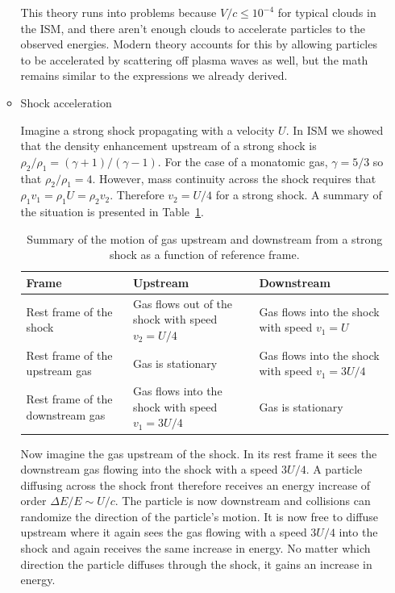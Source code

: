 \begin{enumerate}
\begin{itemize}
            This theory runs into problems because $V/c\le10^{-4}$ for typical clouds in the
            ISM, and there aren't enough clouds to accelerate particles to the observed energies.
            Modern theory accounts for this by allowing particles to be accelerated by scattering
            off plasma waves as well, but the math remains similar to the expressions we
            already derived.

      \item Shock acceleration

            Imagine a strong shock propagating with a velocity $U$.  In ISM we showed that the
            density enhancement upstream of a strong shock is
            $\rho_2/\rho_1 = (\gamma+1)/(\gamma-1)$.  For the case of a monatomic gas,
            $\gamma=5/3$ so that $\rho_2/\rho_1 = 4$.  However, mass continuity across the shock
            requires that $\rho_1v_1 = \rho_1U = \rho_2v_2$.  Therefore $v_2 = U/4$ for a
            strong shock.  A summary of the situation is presented in Table~\ref{tab:strong_shock_speeds}.

            \begin{table}[ht]
            \centering
            \begin{tabular}{p{1.5in}p{1.5in}p{1.5in}}
            \toprule
            Frame & Upstream & Downstream \\
            \midrule
            Rest frame of the shock &
                Gas flows out of the shock with speed $v_2 = U/4$ &
                Gas flows into the shock with speed $v_1 = U$ \\
            Rest frame of the upstream gas &
                Gas is stationary &
                Gas flows into the shock with speed $v_1 = 3U/4$ \\
            Rest frame of the downstream gas &
                Gas flows into the shock with speed $v_1 = 3U/4$ &
                Gas is stationary \\
            \bottomrule
            \end{tabular}
            \caption{Summary of the motion of gas upstream and downstream from a strong shock
                     as a function of reference frame.}
            \label{tab:strong_shock_speeds}
            \end{table}

            Now imagine the gas upstream of the shock.  In its rest frame it sees the downstream
            gas flowing into the shock with a speed $3U/4$.  A particle diffusing across the shock
            front therefore receives an energy increase of order $\Delta E/E \sim U/c$.
            The particle is now downstream and collisions can randomize the direction of the
            particle's motion.  It is now free to diffuse upstream where it again sees the
            gas flowing with a speed $3U/4$ into the shock and again receives the same increase
            in energy.  No matter which direction the particle diffuses through the shock, it
            gains an increase in energy.


\end{itemize}
\end{enumerate}

